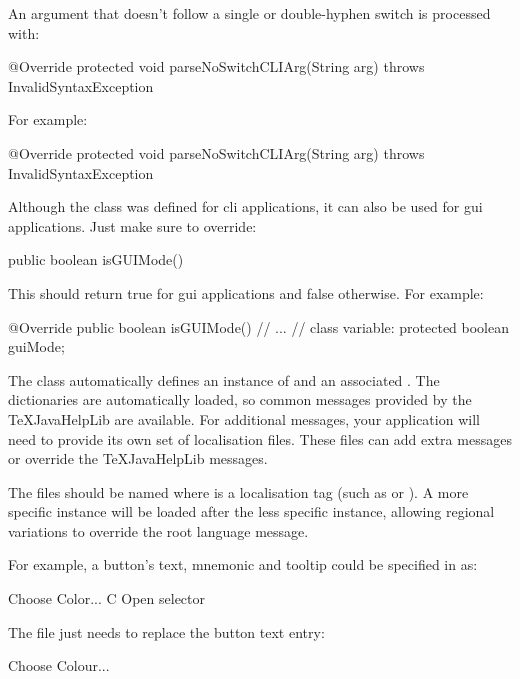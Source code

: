 \documentclass[toc=listof]{scrreport}
\begin{document}
An argument that doesn't follow a single or double-hyphen switch
is processed with:
\begin{codebox}
@Override
protected void parseNoSwitchCLIArg(String arg)
throws InvalidSyntaxException
\end{codebox}
For example:
\begin{codebox}
@Override
protected void parseNoSwitchCLIArg(String arg)
throws InvalidSyntaxException
\end{codebox}

Although the  class was defined for \gls{cli}
applications, it can also be used for \gls{gui} applications. Just
make sure to override:
\begin{codebox}
public boolean isGUIMode()
\end{codebox}
This should return true for \gls{gui} applications and false
otherwise. For example:
\begin{codebox}
@Override
public boolean isGUIMode()
// ...
// class variable:
protected boolean guiMode;
\end{codebox}

The  class automatically defines an instance
of  and an associated .
The  dictionaries are automatically loaded, 
so common messages provided by the \gls{TeXJavaHelpLib} are
available. For additional messages, your application will need to
provide its own set of localisation files. These files can add extra
messages or override the \gls{TeXJavaHelpLib} messages.

The files should be named 
where  is a localisation tag (such as  or
). A more specific instance will be loaded after the less
specific instance, allowing regional variations to override the
root language message.

For example, a button's text, mnemonic and tooltip could be
specified in  as:
\begin{codebox}
Choose Color...
C
Open selector
\end{codebox}
The file  just needs to replace the
button text entry:
\begin{codebox}
Choose Colour...
\end{codebox}
\end{document}

